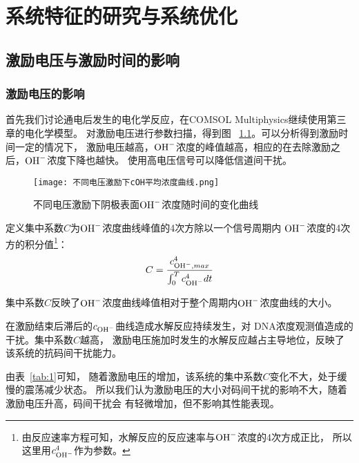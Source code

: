 \chapter{系统特征的研究与系统优化}

\section{激励电压与激励时间的影响}
\subsection{激励电压的影响}

首先我们讨论通电后发生的电化学反应，在COMSOL Multiphysics继续使用第三章的电化学模型。
对激励电压进行参数扫描，得到图 ~\ref{fig:cOH_U}。可以分析得到激励时间一定的情况下，
激励电压越高，$\ce{OH-}$浓度的峰值越高，相应的在去除激励之后，$\ce{OH-}$浓度下降也越快。
使用高电压信号可以降低信道间干扰。

\begin{figure}[H]
    \centering
    \texttt{[image: 不同电压激励下cOH平均浓度曲线.png]}
    \caption{不同电压激励下阴极表面$\ce{OH-}$浓度随时间的变化曲线}
    \label{fig:cOH_U}
\end{figure}

定义集中系数$C$为$\ce{OH-}$浓度曲线峰值的4次方除以一个信号周期内
$\ce{OH-}$浓度的4次方的积分值\footnote{
    由反应速率方程可知，水解反应的反应速率与$\ce{OH-}$浓度的4次方成正比，
    所以这里用$c_{\ce{OH-}}^4$作为参数。
}：
\begin{equation}
    C=\frac{c_{\ce{OH-},max}^4}{\int_0^T{c_{\ce{OH-}}^4}dt}
\end{equation}

集中系数$C$反映了$\ce{OH-}$浓度曲线峰值相对于整个周期内$\ce{OH-}$浓度曲线的大小。

在激励结束后滞后的$c_{\ce{OH-}}$曲线造成水解反应持续发生，对
DNA浓度观测值造成的干扰。集中系数$C$越高，
激励电压施加时发生的水解反应越占主导地位，反映了该系统的抗码间干扰能力。

由表~\ref{tab:1}可知，
随着激励电压的增加，该系统的集中系数$C$变化不大，处于缓慢的震荡减少状态。
所以我们认为激励电压的大小对码间干扰的影响不大，随着激励电压升高，码间干扰会
有轻微增加，但不影响其性能表现。

